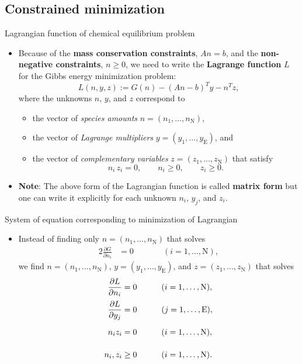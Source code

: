 \subsection{Constrained minimization}
%
\begin{frame}{Lagrangian function of chemical equilibrium problem}
\begin{itemize}
\item Because of the {\bf mass conservation constraints}, $An=b$, and
the {\bf non-negative constraints}, $n\geq0$, we need to write
the \alert{\textbf{Lagrange function}} $L$ for the Gibbs energy minimization problem:
\[
L(n,y,z):=G(n)-(An-b)^{T}y-n^{T}z,
\]
where the \alert{unknowns} $n$, $y$, and $z$ correspond to
%
\begin{itemize}
\item the vector of \emph{species amounts} $n=(n_{1},\ldots,n_{\text{N}})$, 
\item the vector of \emph{Lagrange multipliers} $y=(y_{1},\ldots,y_{\text{E}})$, and 
\item the vector of \emph{complementary variables} $z=(z_{1},\ldots,z_{\text{N}})$ that satisfy 
%	
\[
n_{i}\, z_{i}=0,\qquad n_{i}\geq0,\qquad z_{i}\geq0.
\]
\end{itemize}
\pause
\item {\bf Note}: The above form of the Lagrangian function is called {\bf matrix form} but one can write it explicitly for each unknown $n_{i}$, $y_{j}$, and $z_{i}$. 
\end{itemize}
\end{frame}
%
%
\begin{frame}{System of equation corresponding to minimization of Lagrangian}
\begin{itemize}
\item Instead of finding \alert{only} $n=(n_{1},\ldots,n_{\text{N}})$ that solves 
\begin{alignat*}{2}
\frac{\partial G}{\partial n_{i}} & =0 & \qquad & (i=1,\ldots,\text{N}),
\end{alignat*}
\pause
 we find \alert{$n=(n_{1},\ldots,n_{\text{N}})$}, \alert{$y=(y_{1},\ldots,y_{\text{E}})$},
and \alert{$z=(z_{1},\ldots,z_{\text{N}})$} that solves 
\begin{alignat*}{2}
\frac{\partial L}{\partial n_{i}} & =0 & \qquad\vphantom{\frac{\partial L}{\partial y_{j}}} & (i=1,\ldots,\text{N}),\\
\frac{\partial L}{\partial y_{j}} & =0 & \vphantom{\frac{\partial L}{\partial y_{j}}} & (j=1,\ldots,\text{E}),\\
n_{i}z_{i} & =0 & \vphantom{\frac{\partial L}{\partial y_{j}}} & (i=1,\ldots,\text{N}),\\
n_{i},z_{i} & \geq0 & \vphantom{\frac{\partial L}{\partial y_{j}}} & (i=1,\ldots,\text{N}).
\end{alignat*}
\end{itemize}
\end{frame}
